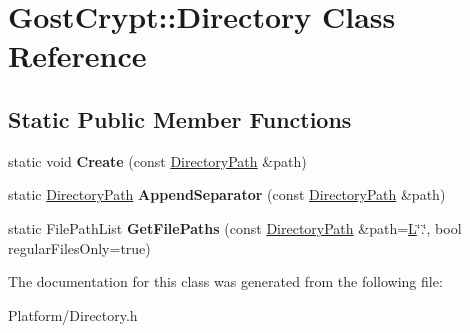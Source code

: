 \hypertarget{class_gost_crypt_1_1_directory}{}\section{Gost\+Crypt\+:\+:Directory Class Reference}
\label{class_gost_crypt_1_1_directory}
\subsection*{Static Public Member Functions}
\begin{DoxyCompactItemize}
\item 
\mbox{\label{class_gost_crypt_1_1_directory_a1ef977ac18ff674301efb994dd15fdd3}} 
static void {\bfseries Create} (const \hyperlink{class_gost_crypt_1_1_filesystem_path}{Directory\+Path} \&path)
\item 
\mbox{\label{class_gost_crypt_1_1_directory_adf33bc6c81f235ead5b5a7081a07f331}} 
static \hyperlink{class_gost_crypt_1_1_filesystem_path}{Directory\+Path} {\bfseries Append\+Separator} (const \hyperlink{class_gost_crypt_1_1_filesystem_path}{Directory\+Path} \&path)
\item 
\mbox{\label{class_gost_crypt_1_1_directory_a4ec4f0a57f46ffdba3e46eccce2a360c}} 
static File\+Path\+List {\bfseries Get\+File\+Paths} (const \hyperlink{class_gost_crypt_1_1_filesystem_path}{Directory\+Path} \&path=\hyperlink{_grasshopper_cipher_8c_ad7ac77c93d4d2a4f28cf4f053605bef0}{L}\char`\"{}.\char`\"{}, bool regular\+Files\+Only=true)
\end{DoxyCompactItemize}


The documentation for this class was generated from the following file\+:\begin{DoxyCompactItemize}
\item 
Platform/Directory.\+h\end{DoxyCompactItemize}
